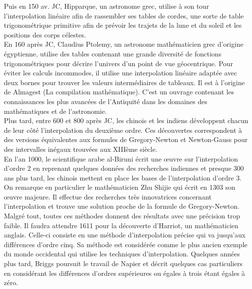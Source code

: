 \documentclass{article}
\begin{document}
\indent
	Puis en 150 av. JC, Hipparque, un astronome grec, utilise \`{a} son tour l'interpolation lin\'{e}aire afin de rassembler ses tables de cordes, une sorte de table trigonom\'{e}trique primitive afin de pr\'{e}voir les trajets de la lune et du soleil et les positions des corps c\'{e}lestes.
\\
\indent
	En 160 apr\`{e}s JC, Claudius Ptolemy, un astronome math\'{e}maticien grec d'origine \'{e}gyptienne, utilise des tables contenant une grande diversit\'{e} de fonctions trigonom\'{e}triques pour d\'{e}crire l'univers d'un point de vue g\'{e}ocentrique. Pour \'{e}viter les calculs incommodes, il utilise une interpolation lin\'{e}aire adapt\'{e}e avec deux bornes pour trouver les valeurs interm\'{e}diaires de tableaux. Il est \`{a} l'origine de Almagest (\guillemotleft La compilation math\'{e}matique\guillemotright). C'est un ouvrage contenant les connaissances les plus avanc\'{e}es de l'Antiquit\'{e} dans les domaines des math\'{e}matiques et de l'astronomie.
\\
\indent
	Plus tard, entre 600 et 800 apr\`{e}s JC, les chinois et les indiens d\'{e}veloppent chacun de leur c\^{o}t\'{e} l'interpolation du deuxi\`{e}me ordre. Ces d\'{e}couvertes correspondent \`{a} des versions \'{e}quivalentes aux formules de Gregory-Newton et Newton-Gauss pour des intervalles in\'{e}gaux trouv\'{e}es aux XIII\`{e}me si\`{e}cle.
\\
\indent
	En l'an 1000, le scientifique arabe al-Biruni \'{e}crit une \oe{}uvre sur l'interpolation d'ordre 2 en reprenant quelques donn\'{e}es des recherches indiennes et presque 300 ans plus tard, les chinois mettent en place les bases de l'interpolation d'ordre 3. On remarque en particulier le math\'{e}maticien Zhu Shijie qui \'{e}crit en 1303 son \oe{}uvre majeure. Il effectue des recherches tr\`{e}s innovatrices concernant l'interpolation et trouve une solution proche de la formule de Gregory-Newton. 
Malgr\'{e} tout, toutes ces m\'{e}thodes donnent des r\'{e}sultats avec une pr\'{e}cision trop faible. Il faudra attendre 1611 pour la d\'{e}couverte d'Harriot, un math\'{e}maticien anglais. Celle-ci consiste en une m\'{e}thode d'interpolation pr\'{e}cise qui va jusqu'aux diff\'{e}rences d'ordre cinq. Sa m\'{e}thode est consid\'{e}r\'{e}e comme le plus ancien exemple du monde occidental qui utilise les techniques d'interpolation. Quelques ann\'{e}es plus tard, Briggs poursuit le travail de Napier et d\'{e}crit quelques cas particuliers en consid\'{e}rant les diff\'{e}rences d'ordres sup\'{e}rieures ou \'{e}gales \`{a} trois \'{e}tant \'{e}gales \`{a} z\'{e}ro.
\end{document}
